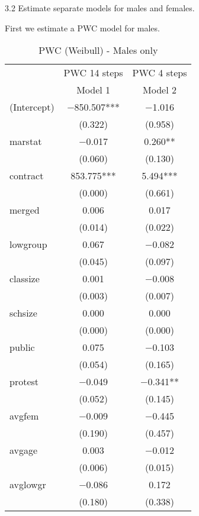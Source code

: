\documentclass[
]{article}
\begin{document}
\clearpage

3.2 Estimate separate models for males and females.

First we estimate a PWC model for males.

\begin{table}[!h]

\caption{\label{tab:unnamed-chunk-19}PWC (Weibull) - Males only}
\centering
\fontsize{8}{10}\selectfont
\begin{tabular}[t]{lcc}
\toprule
\multicolumn{1}{c}{ } & \multicolumn{1}{c}{PWC 14 steps} & \multicolumn{1}{c}{PWC 4 steps} \\
\cmidrule(l{3pt}r{3pt}){2-2} \cmidrule(l{3pt}r{3pt}){3-3}
  & Model 1 & Model 2\\
\midrule
(Intercept) & \num{-850.507}*** & \num{-1.016}\\
 & (\num{0.322}) & (\num{0.958})\\
marstat & \num{-0.017} & \num{0.260}**\\
 & (\num{0.060}) & (\num{0.130})\\
contract & \num{853.775}*** & \num{5.494}***\\
 & (\num{0.000}) & (\num{0.661})\\
merged & \num{0.006} & \num{0.017}\\
 & (\num{0.014}) & (\num{0.022})\\
lowgroup & \num{0.067} & \num{-0.082}\\
 & (\num{0.045}) & (\num{0.097})\\
classize & \num{0.001} & \num{-0.008}\\
 & (\num{0.003}) & (\num{0.007})\\
schsize & \num{0.000} & \num{0.000}\\
 & (\num{0.000}) & (\num{0.000})\\
public & \num{0.075} & \num{-0.103}\\
 & (\num{0.054}) & (\num{0.165})\\
protest & \num{-0.049} & \num{-0.341}**\\
 & (\num{0.052}) & (\num{0.145})\\
avgfem & \num{-0.009} & \num{-0.445}\\
 & (\num{0.190}) & (\num{0.457})\\
avgage & \num{0.003} & \num{-0.012}\\
 & (\num{0.006}) & (\num{0.015})\\
avglowgr & \num{-0.086} & \num{0.172}\\
 & (\num{0.180}) & (\num{0.338})\\

\end{tabular}
\end{table}
\end{document}
